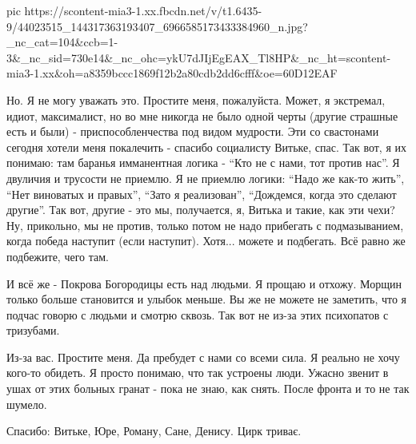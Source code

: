 \ifcmt
   pic https://scontent-mia3-1.xx.fbcdn.net/v/t1.6435-9/44023515_144317363193407_6966585173433384960_n.jpg?_nc_cat=104&ccb=1-3&_nc_sid=730e14&_nc_ohc=ykU7dJIjEgEAX_Tl8HP&_nc_ht=scontent-mia3-1.xx&oh=a8359bccc1869f12b2a80cdb2dd6cfff&oe=60D12EAF

\fi


Но. Я не могу
уважать это. Простите меня, пожалуйста. Может, я экстремал, идиот, максималист,
но во мне никогда не было  одной черты (другие страшные есть и были) -
приспособленчества под видом мудрости. Эти со свастонами сегодня хотели меня
покалечить - спасибо социалисту Витьке, спас. Так вот, я их понимаю: там
баранья имманентная логика - \enquote{Кто не с нами, тот против нас}. Я двуличия и
трусости не приемлю. Я не приемлю логики: \enquote{Надо же как-то жить}, \enquote{Нет виноватых
и правых}, \enquote{Зато я реализован}, \enquote{Дождемся, когда это сделают
другие}. Так вот, другие - это мы, получается, я, Витька и такие, как эти чехи?
Ну, прикольно, мы не против, только потом не надо прибегать с подмазыванием,
когда победа наступит (если наступит). Хотя... можете и подбегать. Всё равно же
подбежите, чего там.

И всё же - Покрова Богородицы есть над людьми. Я прощаю и отхожу. Морщин только
больше становится и улыбок меньше. Вы же не можете не заметить, что я подчас
говорю с людьми и смотрю сквозь. Так вот не из-за этих психопатов с тризубами.

Из-за вас. Простите меня. Да пребудет с нами со всеми сила. Я реально не хочу
кого-то обидеть. Я просто понимаю, что так устроены люди. Ужасно звенит в ушах
от этих больных гранат - пока не знаю, как снять. После фронта и то не так
шумело.

Спасибо: Витьке, Юре, Роману, Сане, Денису. Цирк триває.


